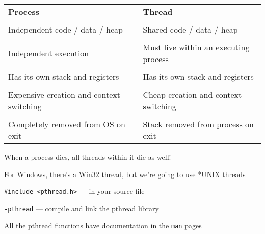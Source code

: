   \begin{slide}


    \begin{tabular}{ll}
      \textbf{Process} & \textbf{Thread} \\
      \\
      Independent code / data / heap & Shared code / data / heap \\
      \\
      Independent execution & Must live within an executing process \\
      \\
      Has its own stack and registers & Has its own stack and registers \\
      \\
      Expensive creation and context switching & Cheap creation and context switching \\
      \\
      Completely removed from OS on exit & Stack removed from process on exit \\
    \end{tabular}
    \medskip

    When a process dies, all threads within it die as well!

  \end{slide}

  \begin{slide}


    For Windows, there's a Win32 thread, but we're going to use *UNIX threads
    \medskip

    \texttt{#include <pthread.h>} --- in your source file
    \medskip

    \texttt{-pthread} --- compile and link the pthread library
    \medskip

    All the pthread functions have documentation in the \texttt{man} pages

  \end{slide}

